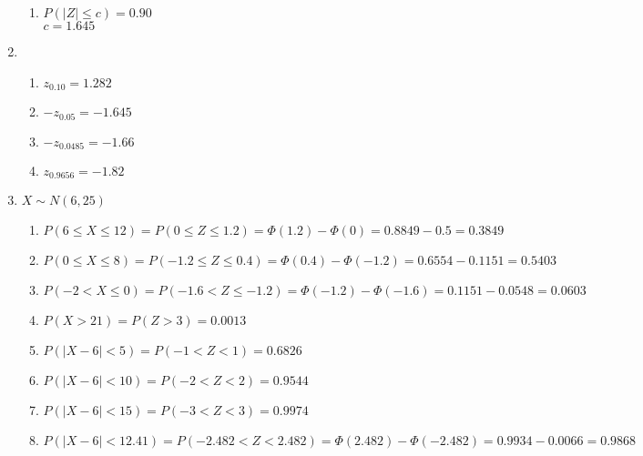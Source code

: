 \documentclass{article}
\begin{document}
\begin{enumerate}
\begin{enumerate}
       \item
	$P(|Z| \le c) = 0.90$ \\
	$c = 1.645$
      \end{enumerate}
     
     \item
      \begin{enumerate}
       \item
	$z_{0.10} = 1.282$
       
       \item
	$-z_{0.05} = -1.645$
       
       \item
	$-z_{0.0485} = -1.66$
       
       \item
	$z_{0.9656} = -1.82$
      \end{enumerate}
     
     \item
      $X \sim N(6,25)$
      \begin{enumerate}
       \item 
	$P(6 \le X \le 12) = P(0 \le Z \le 1.2) = \Phi(1.2) - \Phi(0) = 0.8849 - 0.5 = 0.3849$
       
       \item 
	$P(0 \le X \le 8) = P(-1.2 \le Z \le 0.4) = \Phi(0.4) - \Phi(-1.2) 
	    = 0.6554 - 0.1151 = 0.5403$
       
       \item 
	$P(-2 < X \le 0) = P(-1.6 < Z \le -1.2) = \Phi(-1.2) - \Phi(-1.6) 
	    = 0.1151 - 0.0548 = 0.0603$
       
       \item 
	$P(X > 21) = P(Z > 3) = 0.0013$
       
       \item 
	$P(|X - 6| < 5) = P(-1 < Z < 1) = 0.6826$
       
       \item 
	$P(|X - 6| < 10) = P(-2 < Z < 2) = 0.9544$
       
       \item 
	$P(|X - 6| < 15) = P(-3 < Z < 3) = 0.9974$
       
       \item 
	$P(|X - 6| < 12.41) = P(-2.482 < Z < 2.482) = \Phi(2.482) - \Phi(-2.482) 
	    = 0.9934 - 0.0066 = 0.9868$
      \end{enumerate}
     

\end{enumerate}
\end{document}

